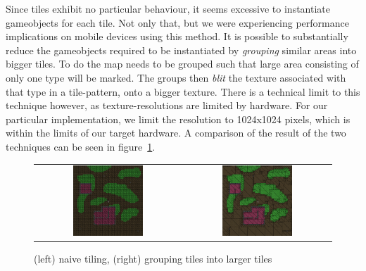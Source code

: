 Since tiles exhibit no particular behaviour, it seems excessive to instantiate gameobjects for each tile. 
Not only that, but we were experiencing performance implications on mobile devices using this method.  
It is possible to substantially reduce the gameobjects required to be instantiated by \textit{grouping} similar areas into bigger tiles. 
To do the map needs to be grouped such that large area consisting of only one type will be marked.
The groups then \textit{blit} the texture associated with that type in a tile-pattern, onto a bigger texture.  
There is a technical limit to this technique however, as texture-resolutions are limited by hardware. 
For our particular implementation, we limit the resolution to 1024x1024 pixels, which is within the limits of our target hardware. 
A comparison of the result of the two techniques can be seen in figure~\ref{fig:grouped_tiling_comparison}.
\begin{figure}[H]
    \centering
    \begin{tabular}{cc}
        \includegraphics[width=0.5\textwidth]{figures/generating_levels/naive-tile.png}
        &
        \includegraphics[width=0.5\textwidth]{figures/generating_levels/grouped-tile.png}
    \end{tabular}
    \caption{(left) naive tiling, (right) grouping tiles into larger tiles}\label{fig:grouped_tiling_comparison}
\end{figure}
